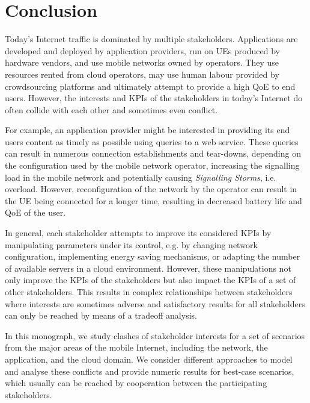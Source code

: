 \chapter{Conclusion}\label{chap:conclusion}

Today's Internet traffic is dominated by multiple stakeholders.
Applications are developed and deployed by application providers, run on \glspl{UE} produced by hardware vendors, and use mobile networks owned by operators.
They use resources rented from cloud operators, may use human labour provided by crowdsourcing platforms and ultimately attempt to provide a high \gls{QoE} to end users.
However, the interests and \glspl{KPI} of the stakeholders in today's Internet do often collide with each other and sometimes even conflict.%

For example, an application provider might be interested in providing its end users content as timely as possible using queries to a web service.
These queries can result in numerous connection establishments and tear-downs, depending on the configuration used by the mobile network operator, increasing the signalling load in the mobile network and potentially causing \emph{Signalling Storms}, i.e. overload.
However, reconfiguration of the network by the operator can result in the \gls{UE} being connected for a longer time, resulting in decreased battery life and \gls{QoE} of the user.  

In general, each stakeholder attempts to improve its considered \glspl{KPI} by manipulating parameters under its control, e.g. by changing network configuration, implementing energy saving mechanisms, or adapting the number of available servers in a cloud environment.
However, these manipulations not only improve the \glspl{KPI} of the stakeholders but also impact the \glspl{KPI} of a set of other stakeholders.
This results in complex relationships between stakeholders where interests are sometimes adverse and satisfactory results for all stakeholders can only be reached by means of a tradeoff analysis.

In this monograph, we study clashes of stakeholder interests for a set of scenarios from the major areas of the mobile Internet, including the network, the application, and the cloud domain.
We consider different approaches to model and analyse these conflicts and provide numeric results for best-case scenarios, which usually can be reached by cooperation between the participating stakeholders.

